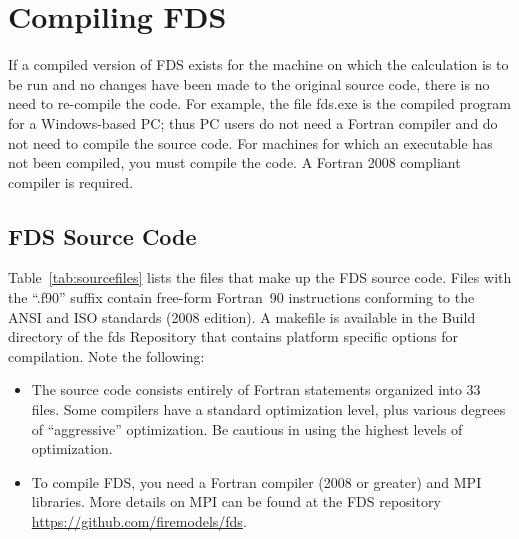 \documentclass[11pt]{book}
\begin{document}
\chapter{Compiling FDS}
\label{info:compilation}

If a compiled version of FDS exists for the machine on which the calculation is to be run and no changes have been made to the original source code, there is no need to re-compile the code. For example, the file {\ct fds.exe} is the compiled program for a Windows-based PC; thus PC users do not need a Fortran compiler and do not need to compile the source code. For machines for which an executable has not been compiled, you must compile the code. A Fortran 2008 compliant compiler is required.

\section{FDS Source Code}

Table~\ref{tab:sourcefiles} lists the files that make up the FDS source code. Files with the ``.f90'' suffix contain free-form Fortran~90 instructions conforming to the ANSI and ISO standards (2008 edition). A {\ct makefile} is available in the Build directory of the fds Repository that contains platform specific options for compilation. Note the following:
\begin{itemize}
\item The source code consists entirely of Fortran statements organized into 33 files. Some compilers have a standard optimization level, plus various degrees of ``aggressive'' optimization. Be cautious in using the highest levels of optimization.
\item To compile FDS, you need a Fortran compiler (2008 or greater) and MPI libraries. More details on MPI can be found at the FDS repository
\href{https://github.com/firemodels/fds}{{https://github.com/firemodels/fds}}.
\end{itemize}
\end{document}
